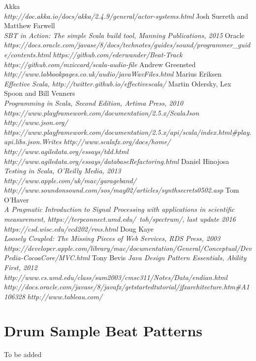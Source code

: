 \documentclass[a4paper, 11pt]{article}
\begin{document}
\begin{thebibliography}{99}
Akka\\
\textit{http://doc.akka.io/docs/akka/2.4.9/general/actor-systems.html}
Josh Suereth and Matthew Farwell\\
\textit{SBT in Action: The simple Scala build tool, Manning Publications, 2015}
Oracle\\
\textit{https://docs.oracle.com/javase/8/docs/technotes/guides/sound/programmer\_guide/contents.html}
\textit{https://github.com/ederwander/Beat-Track}
\textit{https://github.com/mziccard/scala-audio-file}
Andrew Greensted
\textit{http://www.labbookpages.co.uk/audio/javaWavFiles.html}
Marius Eriksen\\
\textit{Effective Scala, http://twitter.github.io/effectivescala/}
Martin Odersky, Lex Spoon and Bill Venners\\
\textit{Programming in Scala, Second Edition, Artima Press, 2010}
\textit{https://www.playframework.com/documentation/2.5.x/ScalaJson}
\textit{http://www.json.org/}
\textit{https://www.playframework.com/documentation/2.5.x/api/scala/index.html\#play.api.libs.json.Writes}
\textit{http://www.scalafx.org/docs/home/}
\textit{http://www.agiledata.org/essays/tdd.html}
\textit{http://www.agiledata.org/essays/databaseRefactoring.html}
Daniel Hinojosa\\
\textit{Testing in Scala, O’Reilly Media, 2013}
\textit{http://www.apple.com/uk/mac/garageband/}
\textit{http://www.soundonsound.com/sos/may02/articles/synthsecrets0502.asp}
Tom O'Haver\\
\textit{A Pragmatic Introduction to Signal Processing with applications in scientific measurement, https://terpconnect.umd.edu/~toh/spectrum/, last update 2016}
\textit{https://csd.wisc.edu/vcd202/rms.html}
Doug Kaye\\
\textit{Loosely Coupled: The Missing Pieces of Web Services, RDS Press, 2003}
\textit{https://developer.apple.com/library/mac/documentation/General/Conceptual/DevPedia-CocoaCore/MVC.html}
Tony Bevis
\textit{Java Design Pattern Essentials, Ability First, 2012}
\textit{http://www.cs.umd.edu/class/sum2003/cmsc311/Notes/Data/endian.html}
\textit{http://docs.oracle.com/javase/8/javafx/get\-started\-tutorial/jfx\-architecture.htm\#A1106328}
\textit{http://www.tableau.com/}
\end{thebibliography}

\newpage

\appendix
\section{Drum Sample Beat Patterns}
To be added
\end{document}
